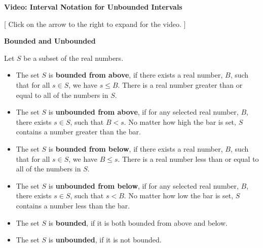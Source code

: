 \documentclass{ximera}
\begin{document}
\begin{explanation} \textbf{Video: Interval Notation for Unbounded Intervals}

[ Click on the arrow to the right to expand for the video. ]
\begin{expandable} 

\begin{center}
\end{center}

\end{expandable}
\end{explanation}










\begin{definition} \item \textbf{\textcolor{green!50!black}{Bounded and Unbounded}}

Let $S$ be a subset of the real numbers. \\


\begin{itemize}
\item The set $S$ is \textbf{bounded from above}, if there exists a real number, $B$, such that for all $s \in S$, we have $s \leq B$.  There is a real number greater than or equal to all of the numbers in $S$.  \\

\item The set $S$ is \textbf{unbounded from above}, if for any selected real number, $B$, there exists $s \in S$, such that $B < s$. No matter how high the bar is set, $S$ contains a number greater than the bar.  \\

\item The set $S$ is \textbf{bounded from below}, if there exists a real number, $B$, such that for all $s \in S$, we have $B \leq s$.  There is a real number less than or equal to all of the numbers in $S$.  \\

\item The set $S$ is \textbf{unbounded from below}, if for any selected real number, $B$, there exists $s \in S$, such that $s < B$. No matter how low the bar is set, $S$ contains a number less than the bar.  \\

\item The set $S$ is \textbf{bounded}, if it is both bounded from above and below.  

\item The set $S$ is \textbf{unbounded}, if it is not bounded.  \\
\end{itemize}


\end{definition}
\end{document}
